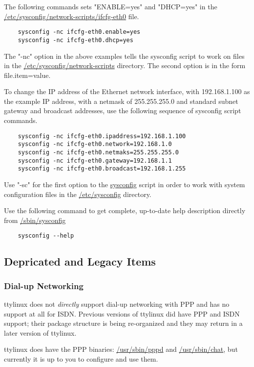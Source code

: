 \documentclass[10pt]{article}
\begin{document}
The following commands sets "ENABLE=yes" and "DHCP=yes" in the
\url{/etc/sysconfig/network-scripts/ifcfg-eth0} file.

\begin{lstlisting}
	sysconfig -nc ifcfg-eth0.enable=yes
	sysconfig -nc ifcfg-eth0.dhcp=yes
\end{lstlisting}

The "-nc" option in the above examples tells the sysconfig script to work on
files in the \url{/etc/sysconfig/network-scripts} directory. The second option
is in the form file.item=value.

To change the IP address of the Ethernet network interface, with 192.168.1.100
as the example IP address, with a netmask of 255.255.255.0 and standard subnet
gateway and broadcast addresses, use the following sequence of sysconfig script
commands.

\begin{lstlisting}
	sysconfig -nc ifcfg-eth0.ipaddress=192.168.1.100
	sysconfig -nc ifcfg-eth0.network=192.168.1.0
	sysconfig -nc ifcfg-eth0.netmaks=255.255.255.0
	sysconfig -nc ifcfg-eth0.gateway=192.168.1.1
	sysconfig -nc ifcfg-eth0.broadcast=192.168.1.255
\end{lstlisting}

Use "-sc" for the first option to the \url{sysconfig} script in order to work
with system configuration files in the \url{/etc/sysconfig} directory.

Use the following command to get complete, up-to-date help description directly
from \url{/sbin/sysconfig}
\begin{lstlisting}
	sysconfig --help
\end{lstlisting}

\subsection{Depricated and Legacy Items}

\subsubsection{Dial-up Networking}

ttylinux does not {\it directly} support dial-up networking with PPP and has no
support at all for ISDN. Previous versions of ttylinux did have PPP and ISDN
support; their package structure is being re-organized and they may return
in a later version of ttylinux.

ttylinux does have the PPP binaries: \url{/usr/sbin/pppd} and
\url{/usr/sbin/chat}, but currently it is up to you to configure and use them.
\end{document}

